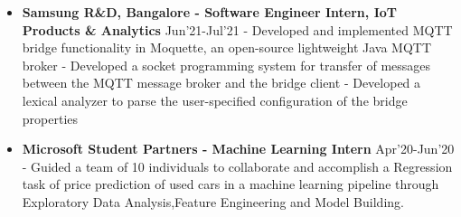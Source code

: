 \documentclass{article}
\begin{document}
\begin{itemize}
    \item{\textbf{\large{Samsung R\&D, Bangalore - Software Engineer Intern, IoT Products \& Analytics}}} \hfill \textmd{Jun'21-Jul'21}
          \newline
          \textmd{- Developed and implemented MQTT bridge functionality in Moquette, an open-source lightweight Java MQTT broker}
          \newline
          \textmd{- Developed a socket programming system for transfer of messages between the MQTT message broker and the bridge client}
          \newline
          \textmd{- Developed a lexical analyzer to parse the user-specified configuration of the bridge properties}
\end{itemize}


\begin{itemize}
    \item{\textbf{\large{Microsoft Student Partners - Machine Learning Intern}}} \hfill \textmd{Apr'20-Jun'20}
          \newline
          \textmd{- Guided a team of 10 individuals to collaborate and accomplish a Regression task of price prediction of used cars in a machine learning pipeline through Exploratory Data Analysis,Feature Engineering and Model Building.}

\end{itemize}


\end{document}
